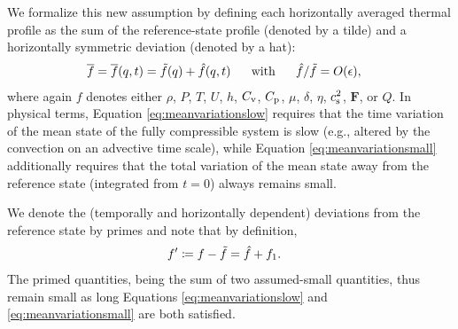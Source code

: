 \documentclass[12pt]{article}
\newcommand{\vecf}{\bm{F}}
\begin{document}
We formalize this new assumption by defining each horizontally averaged thermal profile as the sum of the reference-state profile (denoted by a tilde) and a horizontally symmetric deviation (denoted by a hat):
\begin{align}\label{eq:meanvariationsmall}
\overline{f}=\overline{f}(q,t) &= \tilde{f}(q) + \hat{f}(q,t)\ \ \ \ \ \text{with}\ \ \ \ \  \hat{f}/\tilde{f} = O(\epsilon),
\end{align}
where again $f$ denotes either $\rho$, $P$, $T$, $U$, $h$, $C_{\rm{v}}$, $C_{\rm{p}}$, $\mu$, $\delta$, $\eta$, $c_{\rm s}^2$, $\vecf$, or $Q$. In physical terms, Equation \eqref{eq:meanvariationslow} requires that the time variation of the mean state of the fully compressible system is slow (e.g., altered by the convection on an advective time scale), while Equation \eqref{eq:meanvariationsmall} additionally requires that the total variation of the mean state away from the reference state (integrated from $t=0$) always remains small. 

We denote the (temporally and horizontally dependent) deviations from the reference state by primes and note that by definition, 
\begin{align}\label{eq:defprime}
	f^\prime & \coloneqq f - \tilde{f} =\hat{f} +  f_1.
\end{align}
The primed quantities, being the sum of two assumed-small quantities, thus remain small as long Equations \eqref{eq:meanvariationslow} and \eqref{eq:meanvariationsmall} are both satisfied. 

\end{document}
